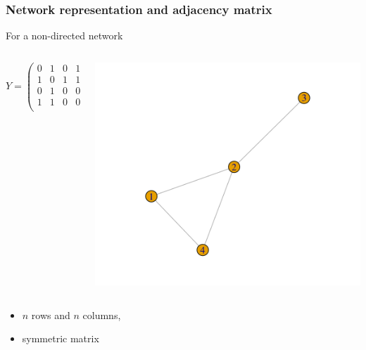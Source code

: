 \documentclass[compress,10pt]{beamer}
\begin{document}
\begin{frame}
\frametitle{Network representation and adjacency matrix}

For a non-directed network
 \begin{columns}
 \begin{column}{.45\paperwidth}
$$Y=\left(
\begin{array}{rrrrr}
 0 & 1 & 0 & 1 \\ 
 1 & 0 & 1 & 1 \\ 
 0 & 1 & 0 & 0 \\ 
 1 & 1 & 0 & 0 \\ 
\end{array}\right)
$$
\end{column}

\begin{column}{.5\paperwidth}

\includegraphics[scale=.5]{plots/graphe_adj.png}

\end{column}

\end{columns}

\begin{itemize}
\item $n$ rows and $n$ columns,
\item symmetric   matrix
\end{itemize}

\end{frame}
\end{document}
